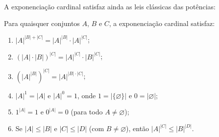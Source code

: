 A exponenciação cardinal satisfaz ainda as leis clássicas das potências:

\begin{proposicao}
    \label{prop:propriedades_exponenciacao_cardinal}
    Para quaisquer conjuntos \(A\), \(B\) e \(C\), a exponenciação cardinal satisfaz:
    \begin{enumerate}
        \item \(|A|^{|B| + |C|} = |A|^{|B|} \cdot |A|^{|C|}\);
        \item \((|A| \cdot |B|)^{|C|} = |A|^{|C|} \cdot |B|^{|C|}\);
        \item \((|A|^{|B|})^{|C|} = |A|^{|B| \cdot |C|}\);
        \item \(|A|^1 = |A|\) e \(|A|^0 = 1\), onde \(1 = |\{\varnothing\}|\) e \(0 = |\varnothing|\);
        \item \(1^{|A|} = 1\) e \(0^{|A|} = 0\) (para todo \(A \neq \varnothing\));
        \item Se \(|A| \leq |B|\) e \(|C| \leq |D|\) (com \(B \neq \varnothing\)), então \(|A|^{|C|} \leq |B|^{|D|}\).
    \end{enumerate}
\end{proposicao}

